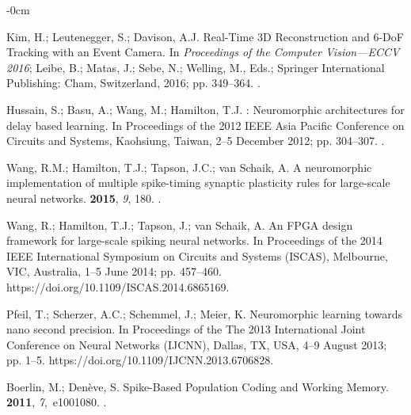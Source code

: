 \documentclass[brainsci, %
               review,accept,pdftex,moreauthors
               ]{Definitions/mdpi}
\begin{document}
\begin{adjustwidth}{-\extralength}{0cm}
\begin{thebibliography}{999}
Kim, H.; Leutenegger, S.; Davison, A.J.
\newblock Real-{Time} {3D} {Reconstruction} and 6-{DoF} {Tracking} with an
  {Event} {Camera}.
\newblock In \emph{Proceedings of the Computer {Vision}---{ECCV} 2016}; Leibe, B.;
  Matas, J.; Sebe, N.; Welling, M., Eds.; Springer International Publishing:
  Cham,  Switzerland, 2016;  pp. 349--364.
.

Hussain, S.; Basu, A.; Wang, M.; Hamilton, T.J.
: {Neuromorphic} architectures for delay based learning.
\newblock In Proceedings of the 2012 {IEEE} {Asia} {Pacific} {Conference} on
  {Circuits} and {Systems},  {Kaohsiung, Taiwan, 2--5 December} %
 2012; pp. 304--307.
.

Wang, R.M.; Hamilton, T.J.; Tapson, J.C.; van Schaik, A.
\newblock A neuromorphic implementation of multiple spike-timing synaptic
  plasticity rules for large-scale neural networks.
 {\bf 2015}, {\em 9}, 180.
.

Wang, R.; Hamilton, T.J.; Tapson, J.; van Schaik, A.
\newblock An {FPGA} design framework for large-scale spiking neural networks.
\newblock In Proceedings of the 2014 {IEEE} {International} {Symposium} on
  {Circuits} and {Systems} ({ISCAS}), {Melbourne, VIC, Australia, 1--5 June} %
 2014; pp. 457--460.
 {{https://doi.org/10.1109/ISCAS.2014.6865169}}.

Pfeil, T.; Scherzer, A.C.; Schemmel, J.; Meier, K.
\newblock Neuromorphic learning towards nano second precision.
\newblock In Proceedings of the The 2013 {International} {Joint} {Conference}
  on {Neural} {Networks} ({IJCNN}), {Dallas, TX, USA, 4--9 August} %
 2013; pp. 1--5.
 {{https://doi.org/10.1109/IJCNN.2013.6706828}}.

Boerlin, M.; Denève, S.
\newblock Spike-{Based} {Population} {Coding} and {Working} {Memory}.
 {\bf 2011}, {\em 7},~e1001080.
.


\end{thebibliography}
\end{adjustwidth}
\end{document}
